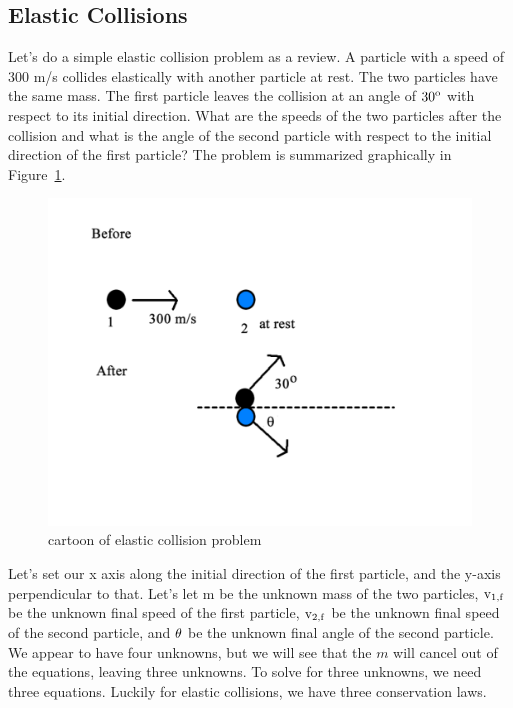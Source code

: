 \subsection{Elastic Collisions}

Let's do a simple elastic collision problem as a review. A particle with a speed of 300 m/s collides elastically with another particle at rest. The two particles have the same mass. The first particle leaves the collision at an angle of ${\rm 30^o}$ with respect to its initial direction. What are the speeds of the two particles after the collision and what is the angle of the second particle with respect to the initial direction of the first particle? The problem is summarized graphically in Figure~\ref{fig:elastic}.

 
\begin{figure}[h]
\centering\includegraphics[scale=0.5]{./collisions/Pictures/elastic.pdf}
\caption{cartoon of elastic collision problem}
\label{fig:elastic}
\end{figure}

Let's set our x axis along the initial direction of the first particle, and the y-axis perpendicular to that.  Let's let m be the unknown mass of the two particles, 
${\rm v_{1,f}}$ be the unknown final speed of the first particle,
${\rm v_{2,f}}$ be the unknown final speed of the second particle,
and
${\rm \theta}$ be the unknown final angle of the second particle.
We appear to have four unknowns, but we will see that the $m$ will cancel out of the equations, leaving three unknowns. To solve for three unknowns, we need three equations.  Luckily for elastic collisions, we have three conservation laws.

